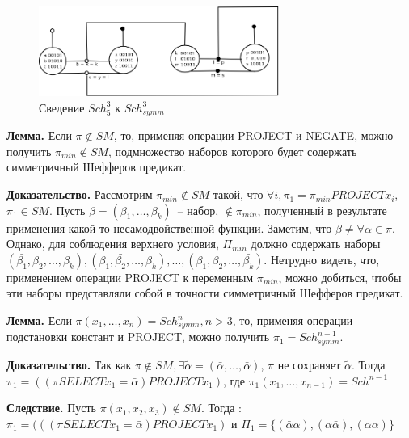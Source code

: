 \documentclass[12pt]{article}
\begin{document}
\begin{figure}[htb]
\centering
\includegraphics[width=0.7\textwidth]{scheff5.png}
\caption{Сведение $Sch_5^3$ к $Sch_{symm}^3$}
\label{fig:scheff3_5}
\end{figure}



\label{eq:lemma_sm}
\textbf{Лемма.} Если $\pi \notin SM$, то, применяя операции PROJECT и NEGATE,
можно получить $\pi_{min} \notin SM$, подмножество наборов которого будет содержать симметричный Шефферов предикат.

\textbf{Доказательство.} Рассмотрим $\pi_{min} \notin SM$ такой, что $\forall i, \pi_1 = \pi_{min} PROJECT x_i$, $\pi_1 \in SM$.
Пусть $\beta = (\beta_1, \dots, \beta_k)$~-- набор, $\notin \pi_{min}$, полученный в результате применения какой-то несамодвойственной функции.
Заметим, что $\beta \neq \forall \alpha \in \pi$. Однако, для соблюдения верхнего условия, $\Pi_{min}$ должно содержать наборы 
$(\bar{\beta_1}, \beta_2, \dots, \beta_k), (\beta_1, \bar{\beta_2}, \dots, \beta_k), \dots, (\beta_1, \beta_2, \dots, \bar{\beta_k})$.
Нетрудно видеть, что, применением операции PROJECT к переменным $\pi_{min}$, можно добиться, 
чтобы эти наборы представляли собой в точности симметричный Шефферов предикат. 

\label{eq:svedenie}
\textbf{Лемма.} Если $\pi(x_1, \dots, x_n) = Sch_{symm}^n, n > 3$, то, применяя операции подстановки констант и PROJECT, можно
получить $\pi_1 = Sch_{symm}^{n-1}$.

\textbf{Доказательство.} Так как 
$\pi \notin SM, \exists \widetilde{\alpha} = (\bar{\alpha}, \dots, \bar{\alpha})$, $\pi$ не сохраняет $\widetilde{\alpha}$.
Тогда 
$\pi_1 = ( (\pi SELECT x_1=\bar{\alpha})  PROJECT  x_1 )$, где $\pi_1(x_1, \dots, x_{n-1}) = Sch^{n-1}$

\label{eq:3tuples}
\textbf{Следствие.} Пусть $\pi(x_1, x_2, x_3) \notin SM$. 
Тогда : $\pi_1 = (((\pi SELECT x_1=\bar{\alpha}) PROJECT x_1)$ и 
$\Pi_1 = \{ (\bar{\alpha}\alpha), (\alpha\bar{\alpha}), (\alpha\alpha) \}$
\end{document}
